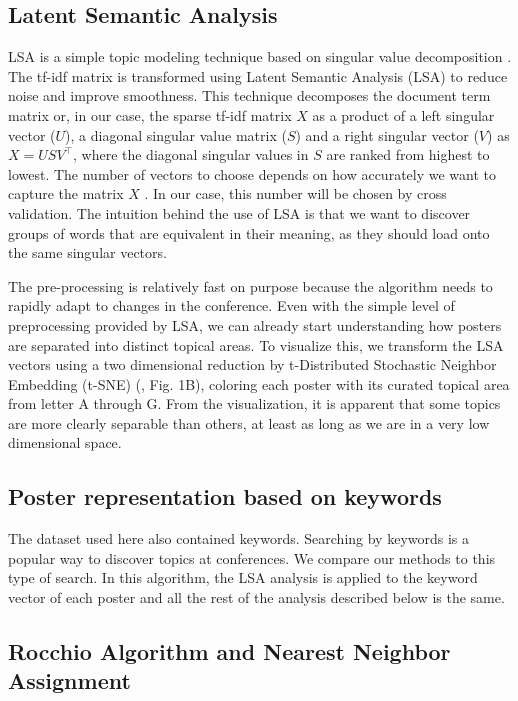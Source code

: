 \documentclass[a4paper]{article}
\begin{document}
\subsection{Latent Semantic Analysis}

LSA is a simple topic modeling technique based on singular value decomposition \cite{landauer1998introduction}. The tf-idf matrix is transformed using Latent Semantic Analysis (LSA) to reduce noise and improve smoothness. This technique decomposes the document term matrix or, in our case, the sparse tf-idf matrix $X$ as a product of a left singular vector ($U$), a diagonal singular value matrix ($S$) and a right singular vector ($V$) as $X = USV^\top$, where the diagonal singular values in $S$ are ranked from highest to lowest. The number of vectors to choose depends on how accurately we want to capture the matrix $X$ \cite{bishop2006pattern}. In our case, this number will be chosen by cross validation. The intuition behind the use of LSA is that we want to discover groups of words that are equivalent in their meaning, as they should load onto the same singular vectors.


The pre-processing is relatively fast on purpose because the algorithm needs to rapidly adapt to changes in the conference. Even with the simple level of preprocessing provided by LSA, we can already start understanding how posters are separated into distinct topical areas. To visualize this, we transform the LSA vectors using a two dimensional reduction by t-Distributed Stochastic Neighbor Embedding (t-SNE) (\cite{van2008visualizing}, Fig. 1B), coloring each poster with its curated topical area from letter A through G. From the visualization, it is apparent that some topics are more clearly separable than others, at least as long as we are in a very low dimensional space.

\subsection{Poster representation based on keywords}

The dataset used here also contained keywords. Searching by keywords is a popular way to discover topics at conferences. We compare our methods to this type of search. In this algorithm, the LSA analysis is applied to the keyword vector of each poster and all the rest of the analysis described below is the same.


\subsection{Rocchio Algorithm and Nearest Neighbor Assignment}
\end{document}
